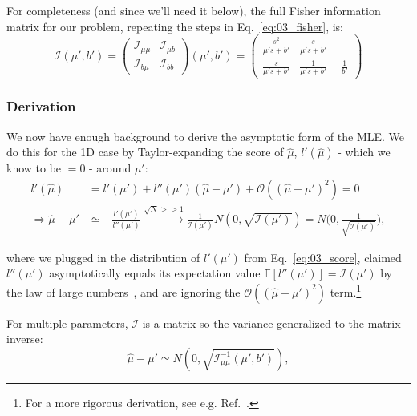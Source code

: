 For completeness (and since we'll need it below), the full Fisher information matrix for our problem, repeating the steps in Eq.~\ref{eq:03_fisher}, is:
\begin{equation}
    \mathcal I(\mu', b')
    = \begin{pmatrix}\mathcal I_{\mu\mu} & \mathcal I_{\mu b} \\ \mathcal I_{b\mu} & \mathcal I_{bb}\end{pmatrix}(\mu', b')
    = \begin{pmatrix}
    \frac{s^2}{\mu' s + b'} & \frac{s}{\mu' s + b'} \\ \frac{s}{\mu' s + b'} & \frac{1}{\mu' s + b'} + \frac{1}{b'}
    \end{pmatrix}
\label{eq:03_fishermatrix}
\end{equation}


\subsubsection{Derivation}
\label{sec:03_pmle_derivation}

We now have enough background to derive the asymptotic form of the MLE. 
We do this for the 1D case by Taylor-expanding the score of $\hat \mu$, $l'(\hat\mu)$ - which we know to be $ = 0$ - around $\mu'$:
\begin{align}
l'(\hat\mu) &= l'(\mu') + l''(\mu')(\hat\mu - \mu') + \mathcal O((\hat\mu - \mu')^2) = 0 \\
\Rightarrow \hat\mu - \mu' &\simeq - \frac{l'(\mu')}{l''(\mu')} \xrightarrow{\sqrt{N} >> 1} \frac{1}{\mathcal I(\mu')}N(0, \sqrt{\mathcal I(\mu')}) = N\bigg(0, \frac{1}{\sqrt{\mathcal I(\mu')}}\bigg),
\label{eq:03_taylorl}
\end{align}

where we plugged in the distribution of $l'(\mu')$ from Eq.~\ref{eq:03_score}, claimed $l''(\mu')$ asymptotically equals its expectation value $\mathbb E[l''(\mu')] = \mathcal I(\mu')$ by the law of large numbers~\cite{enwiki:1256071749}, and are ignoring the $\mathcal O((\hat\mu - \mu')^2)$ term.\footnote{For a more rigorous derivation, see e.g. Ref.~\cite{gundersen_asymptotic_2019}.}

For multiple parameters, $\mathcal I$ is a matrix so the variance generalized to the matrix inverse:
\begin{equation}
    \hat\mu - \mu' \simeq N(0, \sqrt{\mathcal I^{-1}_{\mu\mu}(\mu', b')}),
\label{eq:03_asym_std_fisher}
\end{equation}

